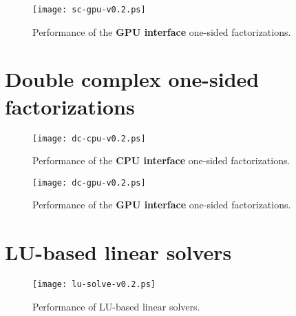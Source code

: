 \documentclass[10pt]{book}
\begin{document}
       \begin{figure}[!ht]
          \centering
          \hspace{-5mm}
          \texttt{[image: sc-gpu-v0.2.ps]}
          \caption{Performance of the {\bf GPU interface}
                   one-sided factorizations.}
       \label{sp-gpu-performance}
       \end{figure}

\newpage
\section{Double complex one-sided factorizations}
       \begin{figure}[!ht]
          \centering
          \hspace{-5mm}
          \texttt{[image: dc-cpu-v0.2.ps]}
          \caption{Performance of the {\bf CPU interface} 
                   one-sided factorizations.}
       \label{dp-cpu-performance}
       \end{figure}

       \begin{figure}[!ht]
          \centering
          \hspace{-5mm}
          \texttt{[image: dc-gpu-v0.2.ps]}
          \caption{Performance of the {\bf GPU interface} 
                   one-sided factorizations.}
       \label{dp-gpu-performance}
       \end{figure}

\newpage
\section{LU-based linear solvers}
       \begin{figure}[!ht]
          \centering
          \hspace{-5mm}
          \texttt{[image: lu-solve-v0.2.ps]}
          \caption{Performance of LU-based linear solvers.}
       \label{lu-solvers}
       \end{figure}
\end{document}
